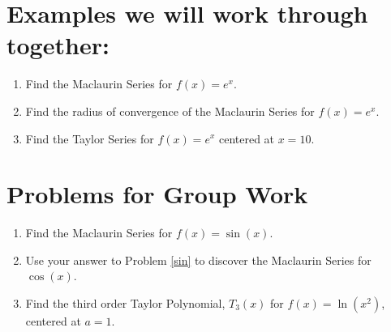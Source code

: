 


\vfill

\section*{Examples we will work through together:}

\begin{enumerate}[{Example }1:]


\item Find the Maclaurin Series for \(f(x) = e^x\). \vfill
\item Find the radius of convergence of the Maclaurin Series for \(f(x) = e^x\). \vfill
\item Find the Taylor Series for \(f(x) = e^x\) centered at \(x=10\).\vfill


\end{enumerate}


\section*{Problems for Group Work}

\begin{enumerate}[{Problem }1:]
\item Find the Maclaurin Series for \(f(x) = \sin(x)\).\vfill \label{sin}
\item Use your answer to Problem \ref{sin} to discover the Maclaurin Series for \(\cos(x)\).\vfill
\item Find the third order Taylor Polynomial, \(T_3(x)\) for \(f(x) = \ln(x^2)\), centered at \(a=1\).\vfill


\end{enumerate}

